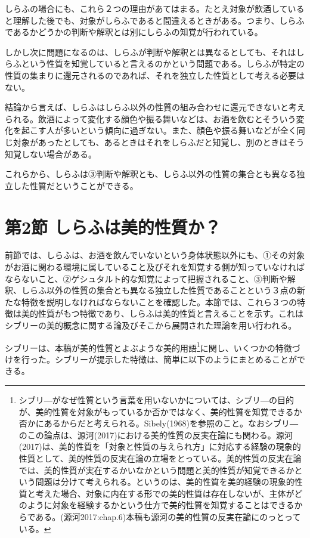 \documentclass[b5j,twoside,twocolumn]{utarticle}
\begin{document}
{しらふの場合にも、これら２つの理由があてはまる。たとえ対象が飲酒していると理解した後でも、対象がしらふであると間違えるときがある。つまり、しらふであるかどうかの判断や解釈とは別にしらふの知覚が行われている。

しかし次に問題になるのは、しらふが判断や解釈とは異なるとしても、それはしらふという性質を知覚していると言えるのかという問題である。しらふが特定の性質の集まりに還元されるのであれば、それを独立した性質として考える必要はない。

結論から言えば、しらふはしらふ以外の性質の組み合わせに還元できないと考えられる。飲酒によって変化する顔色や振る舞いなどは、お酒を飲むとそういう変化を起こす人が多いという傾向に過ぎない。また、顔色や振る舞いなどが全く同じ対象があったとしても、あるときはそれをしらふだと知覚し、別のときはそう知覚しない場合がある。

これらから、しらふは③判断や解釈とも、しらふ以外の性質の集合とも異なる独立した性質だということができる。

\section{第2節 しらふは美的性質か？}
前節では、しらふは、お酒を飲んでいないという身体状態以外にも、①その対象がお酒に関わる環境に属していること及びそれを知覚する側が知っていなければならないこと、②ゲシュタルト的な知覚によって把握されること、③判断や解釈、しらふ以外の性質の集合とも異なる独立した性質であることという３点の新たな特徴を説明しなければならないことを確認した。本節では、これら３つの特徴は美的性質がもつ特徴であり、しらふは美的性質と言えることを示す。これはシブリーの美的概念に関する論及びそこから展開された理論を用い行われる。

シブリーは、本稿が美的性質とよぶような美的用語\footnote{シブリ―がなぜ性質という言葉を用いないかについては、シブリ―の目的が、美的性質を対象がもっているか否かではなく、美的性質を知覚できるか否かにあるからだと考えられる。Sibely(1968)を参照のこと。なおシブリ―のこの論点は、源河(2017)における美的性質の反実在論にも関わる。源河(2017)は、美的性質を「対象と性質の与えられ方」に対応する経験の現象的性質として、美的性質の反実在論の立場をとっている。美的性質の反実在論では、美的性質が実在するかいなかという問題と美的性質が知覚できるかという問題は分けて考えられる。というのは、美的性質を美的経験の現象的性質と考えた場合、対象に内在する形での美的性質は存在しないが、主体がどのように対象を経験するかという仕方で美的性質を知覚することはできるからである。(源河2017:chap.6)本稿も源河の美的性質の反実在論にのっとっている。}に関し、いくつかの特徴づけを行った。シブリーが提示した特徴は、簡単に以下のようにまとめることができる。

}
\end{document}
